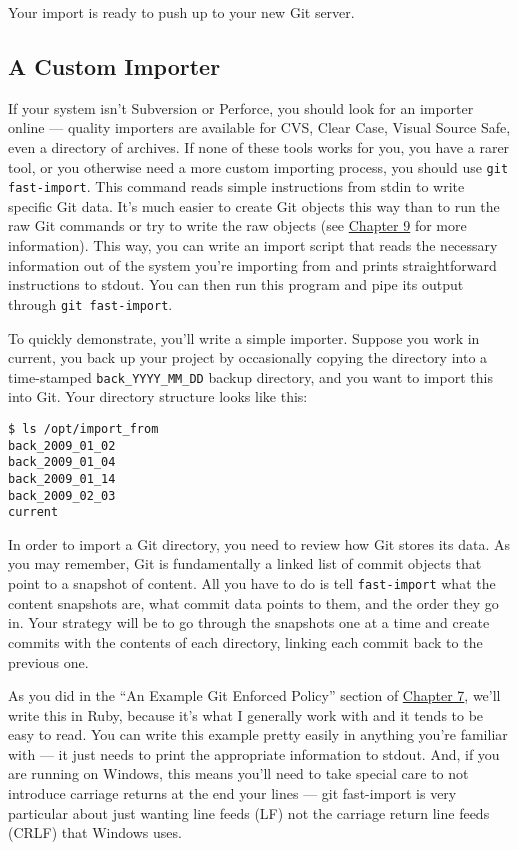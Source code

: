 \documentclass[a4paper]{book}
\newcommand{\prechap}{Chapter }
\newcommand{\postchap}{}
\newcommand{\chapref}[1]{\hyperref[chap:#1]{\prechap #1\postchap}}
\begin{document}
Your import is ready to push up to your new Git server.

\subsection{A Custom Importer}\label{a-custom-importer}

If your system isn't Subversion or Perforce, you should look for an importer online --- quality importers are available for CVS, Clear Case, Visual Source Safe, even a directory of archives. If none of these tools works for you, you have a rarer tool, or you otherwise need a more custom importing process, you should use \texttt{git fast-import}. This command reads simple instructions from stdin to write specific Git data. It's much easier to create Git objects this way than to run the raw Git commands or try to write the raw objects (see \chapref{9} for more information). This way, you can write an import script that reads the necessary information out of the system you're importing from and prints straightforward instructions to stdout. You can then run this program and pipe its output through \texttt{git fast-import}.

To quickly demonstrate, you'll write a simple importer. Suppose you work in current, you back up your project by occasionally copying the directory into a time-stamped \texttt{back\_YYYY\_MM\_DD} backup directory, and you want to import this into Git. Your directory structure looks like this:

\begin{shaded}\begin{verbatim}
$ ls /opt/import_from
back_2009_01_02
back_2009_01_04
back_2009_01_14
back_2009_02_03
current
\end{verbatim}\end{shaded}

In order to import a Git directory, you need to review how Git stores its data. As you may remember, Git is fundamentally a linked list of commit objects that point to a snapshot of content. All you have to do is tell \texttt{fast-import} what the content snapshots are, what commit data points to them, and the order they go in. Your strategy will be to go through the snapshots one at a time and create commits with the contents of each directory, linking each commit back to the previous one.

As you did in the “An Example Git Enforced Policy” section of \chapref{7}, we'll write this in Ruby, because it's what I generally work with and it tends to be easy to read. You can write this example pretty easily in anything you're familiar with --- it just needs to print the appropriate information to stdout. And, if you are running on Windows, this means you'll need to take special care to not introduce carriage returns at the end your lines --- git fast-import is very particular about just wanting line feeds (LF) not the carriage return line feeds (CRLF) that Windows uses.
\end{document}
